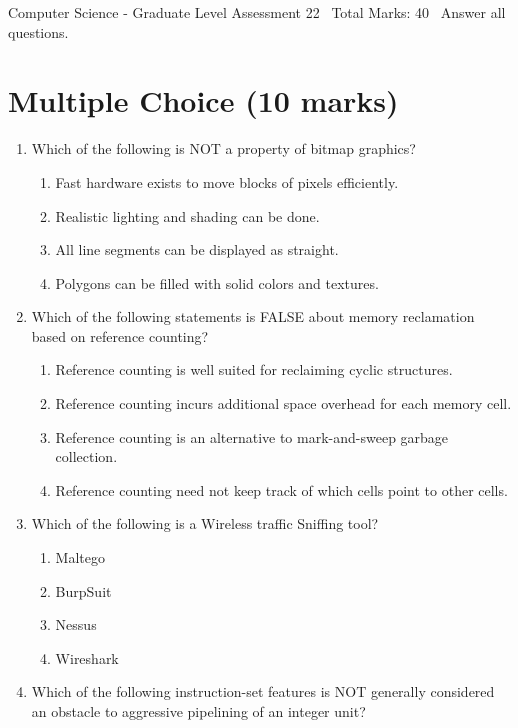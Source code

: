 \documentclass[12pt]{article}
\begin{document}
\begin{center}
Computer Science - Graduate Level Assessment 22 \
Total Marks: 40 \
Answer all questions.
\end{center}

\section*{Multiple Choice (10 marks)}
\begin{enumerate}[label=\arabic*.]
\item Which of the following is NOT a property of bitmap graphics?
\begin{enumerate}[label=(\alph*)]
    \item Fast hardware exists to move blocks of pixels efficiently.
    \item Realistic lighting and shading can be done.
    \item All line segments can be displayed as straight.
    \item Polygons can be filled with solid colors and textures.
\end{enumerate}
\item Which of the following statements is FALSE about memory reclamation based on reference counting?
\begin{enumerate}[label=(\alph*)]
    \item Reference counting is well suited for reclaiming cyclic structures.
    \item Reference counting incurs additional space overhead for each memory cell.
    \item Reference counting is an alternative to mark-and-sweep garbage collection.
    \item Reference counting need not keep track of which cells point to other cells.
\end{enumerate}
\item Which of the following is a Wireless traffic Sniffing tool?
\begin{enumerate}[label=(\alph*)]
    \item Maltego
    \item BurpSuit
    \item Nessus
    \item Wireshark
\end{enumerate}
\item Which of the following instruction-set features is NOT generally considered an obstacle to aggressive pipelining of an integer unit?
\begin{enumerate}[label=(\alph*)]

\end{enumerate}
\end{enumerate}
\end{document}

